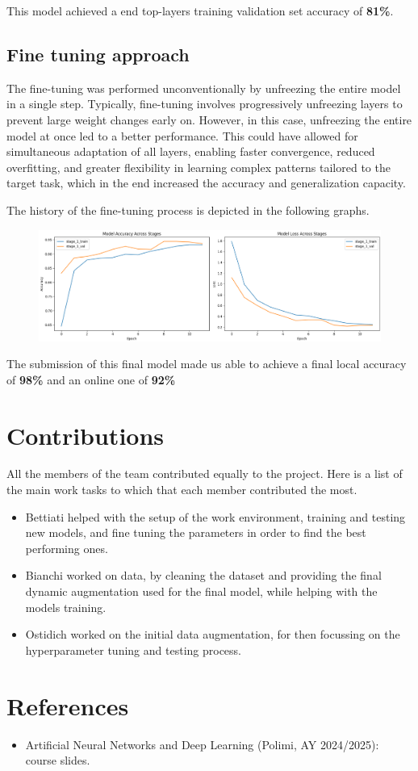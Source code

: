\documentclass[11pt]{article}
\begin{document}
This model achieved a end top-layers training validation set accuracy of \textbf{81\%}.

\subsection{Fine tuning approach}

The fine-tuning was performed unconventionally by unfreezing the entire model in a single step.
Typically, fine-tuning involves progressively unfreezing layers to prevent large weight changes early on.
However, in this case, unfreezing the entire model at once led to a better performance. 
This could have allowed for simultaneous adaptation of all layers, enabling faster convergence, reduced overfitting, and greater flexibility in learning complex patterns tailored to the target task, which in the end increased the accuracy and generalization capacity.

The history of the fine-tuning process is depicted in the following graphs.

\begin{figure}[h!]
    \centering
    \includegraphics[width=\textwidth]{images/final_model_history.png}

\end{figure}

The submission of this final model made us able to achieve a final local accuracy of \textbf{98\%} and an online one of \textbf{92\%}

\section{Contributions}

All the members of the team contributed equally to the project. 
Here is a list of the main work tasks to which that each member contributed the most.

\begin{itemize}
    \item Bettiati helped with the setup of the work environment, training and testing new models, and fine tuning the parameters in order to find the best performing ones.
    \item Bianchi worked on data, by cleaning the dataset and providing the final dynamic augmentation used for the final model, while helping with the models training.
    \item Ostidich worked on the initial data augmentation, for then focussing on the hyperparameter tuning and testing process.
\end{itemize}

\section{References}

\begin{itemize}
    \item Artificial Neural Networks and Deep Learning (Polimi, AY 2024/2025): course slides.
\end{itemize}
\end{document}
